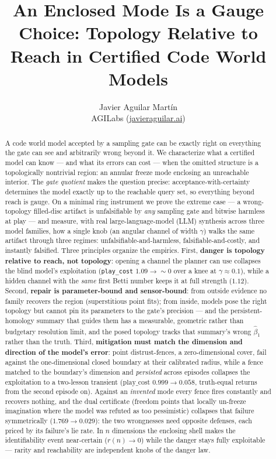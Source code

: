 \documentclass[11pt]{article}
\title{An Enclosed Mode Is a Gauge Choice: Topology Relative to Reach
in Certified Code World Models}
\author{Javier Aguilar Mart\'in\\ AGILabs (\href{https://javieraguilar.ai}{javieraguilar.ai})}
\date{}
\theoremstyle{remark}
\begin{document}
\maketitle

\begin{abstract}
A code world model accepted by a sampling gate can be exactly right on
everything the gate can see and arbitrarily wrong beyond it. We characterize
what a certified model can know --- and what its errors can cost --- when the
omitted structure is a topologically nontrivial region: an annular freeze
mode enclosing an unreachable interior. The \emph{gate quotient} makes the
question precise: acceptance-with-certainty determines the model exactly up
to the reachable query set, so everything beyond reach is gauge. On a minimal
ring instrument we prove the extreme case --- a wrong-topology filled-disc
artifact is unfalsifiable by \emph{any} sampling gate and bitwise harmless at
play --- and measure, with real large-language-model (LLM) synthesis across
three model families,
how a single knob (an angular channel of width $\gamma$) walks the same
artifact through three regimes: unfalsifiable-and-harmless,
falsifiable-and-costly, and instantly falsified. Three principles organize
the empirics. First, \textbf{danger is topology relative to reach, not
topology}: opening a channel the planner can use collapses the blind model's
exploitation (\texttt{play\_cost} $1.09 \to {\sim}0$ over a knee at
$\gamma \approx 0.1$), while a hidden channel with the \emph{same} first
Betti number keeps it at full strength ($1.12$). Second, \textbf{repair is
parameter-bound and sensor-bound}: from outside evidence no family recovers
the region (superstitious point fits); from inside, models pose the right
topology but cannot pin its parameters to the gate's precision --- and the
persistent-homology summary that guides them has a measurable,
geometric rather than budgetary resolution limit, and the posed
topology tracks that summary's wrong $\hat\beta_1$ rather than the
truth.
Third, \textbf{mitigation must match the dimension and direction of the
model's error}: point distrust-fences, a zero-dimensional cover, fail
against the one-dimensional closed boundary at their calibrated radius,
while a fence matched to the boundary's dimension and \emph{persisted}
across episodes collapses the exploitation to a two-lesson transient
($\mathrm{play\_cost}$ $0.999 \to 0.058$, truth-equal returns from the
second episode on). Against an \emph{invented} mode every fence fires
constantly and recovers nothing, and the dual certificate (freedom
points that locally un-freeze imagination where the model was refuted as
too pessimistic) collapses that failure symmetrically
($1.769 \to 0.029$): the two wrongnesses need opposite defenses, each
priced by its failure's lie rate. In $n$ dimensions the enclosing shell makes the identifiability
event near-certain ($r(n) \to 0$) while the danger stays fully exploitable
--- rarity and reachability are independent knobs of the danger law.
\end{abstract}
\end{document}
